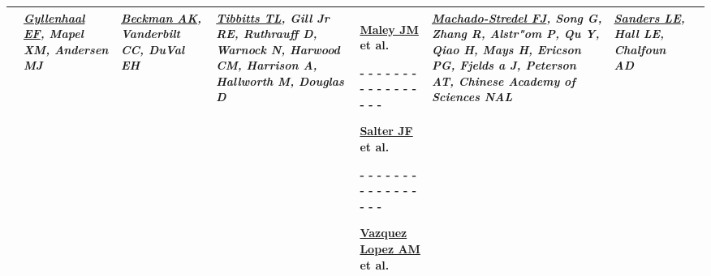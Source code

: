 \begin{tabular}{|x{0.8cm}|x{2.65cm}|x{2.65cm}|a{2.65cm}|y{2.65cm}|x{2.65cm}|x{2.65cm}|@{}m{0pt}@{}}
& \par \vspace{8pt} \textit{\underline{Gyllenhaal EF}, Mapel XM, Andersen MJ} &  \par \vspace{8pt} \textit{\underline{Beckman AK}, Vanderbilt CC, DuVal EH} &  \par \vspace{8pt} \textit{\underline{Tibbitts TL}, Gill Jr RE, Ruthrauff D, Warnock N, Harwood CM, Harrison A, Hallworth M, Douglas D} & \scriptsize {} \par \tiny \underline{Maley JM} et al.\par - - - - - - - - - - - - - - - - - \par \vspace{2pt} \scriptsize {} \par \tiny \underline{Salter JF} et al.\par - - - - - - - - - - - - - - - - - \par \vspace{2pt} \scriptsize {} \par \tiny \underline{Vazquez Lopez AM} et al. &  \par \vspace{8pt} \textit{\underline{Machado-Stredel FJ}, Song G, Zhang R, Alstr"{o}m P, Qu Y, Qiao H, Mays H, Ericson PG, Fjelds
{a} J, Peterson AT, Chinese Academy of Sciences NAL} &  \par \vspace{8pt} \textit{\underline{Sanders LE}, Hall LE, Chalfoun AD}&\\[25ex]
\hline

\end{tabular}
